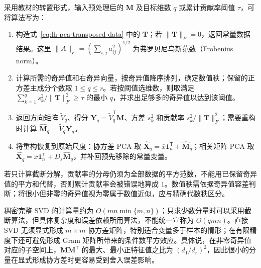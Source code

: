 采用教材的转置形式，输入预处理后的 $\mathbf M$ 及目标维数 $q$ 或累计贡献率阈值 $\tau$，可将算法写为：
\begin{enumerate}
\item 构造式~\eqref{eq:lh-pca-transposed-data} 中的 $\mathbf T$；若 $\|\mathbf T\|_F=0$，返回常量数据结果。这里 $\|A\|_F=(\sum_{i,j}a_{ij}^2)^{1/2}$ 为弗罗贝尼乌斯范数（Frobenius norm）。
\item 计算所需的奇异值和右奇异向量，按奇异值降序排列，确定数值秩；保留的正方差主成分个数取 $1\leq q\leq r$。若按阈值选维数，则取满足 $\sum_{k=1}^q s_k^2/\|\mathbf T\|_F^2\geq\tau$ 的最小 $q$，并求出足够多的奇异值以达到该阈值。
\item 返回方向矩阵 $\widetilde V_q$、得分 $\mathbf Y_q=\widetilde V_q^{\mathsf T}\mathbf M$、方差 $s_k^2$ 和贡献率 $s_k^2/\|\mathbf T\|_F^2$；需要重构时计算 $\widehat{\mathbf M}_q=\widetilde V_q\mathbf Y_q$。
\item 将重构恢复到原始尺度：协方差 PCA 取 $\widehat{\mathbf X}_q=\bar x\mathbf 1_n^{\mathsf T}+\widehat{\mathbf M}_q$；相关矩阵 PCA 取 $\widehat{\mathbf X}_q=\bar x\mathbf 1_n^{\mathsf T}+D_s\widehat{\mathbf M}_q$，并补回预先移除的常量变量。
\end{enumerate}
若只计算截断分解，贡献率的分母仍须为全部数据的平方范数，不能用已保留奇异值的平方和代替，否则累计贡献率会被错误地算成 $1$。数值秩需依据奇异值容差判断；将很小但非零的奇异值视为零属于数值近似，应与精确代数秩区分。

稠密完整 SVD 的计算量约为 $O(mn\min\{m,n\})$；只求少数分量时可以采用截断算法，但具体复杂度和误差依赖所用算法，不能统一宣称为 $O(qmn)$。直接 SVD 无须显式形成 $m\times m$ 协方差矩阵，特别适合变量多于样本的情形；在有限精度下还可避免形成 Gram 矩阵所带来的条件数平方效应。具体说，在非零奇异值对应的子空间上，$\mathbf M\mathbf M^{\mathsf T}$ 的最大、最小正特征值之比为 $(d_1/d_r)^2$，因此很小的分量在显式形成协方差时更容易受到舍入误差影响。

